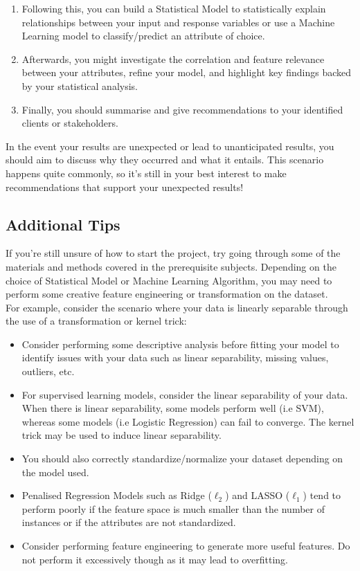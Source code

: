 \documentclass[12pt]{article}
\begin{document}
\begin{enumerate}
    \item Following this, you can build a Statistical Model to statistically explain relationships between your input and response variables or use a Machine Learning model to classify/predict an attribute of choice. 
    \item Afterwards, you might investigate the correlation and feature relevance between your attributes, refine your model, and highlight key findings backed by your statistical analysis.
    \item Finally, you should summarise and give recommendations to your identified clients or stakeholders. 
\end{enumerate}

In the event your results are unexpected or lead to unanticipated results, you should aim to discuss why they occurred and what it entails. This scenario happens quite commonly, so it's still in your best interest to make recommendations that support your unexpected results!

\subsection*{Additional Tips}
If you're still unsure of how to start the project, try going through some of the materials and methods covered in the prerequisite subjects. Depending on the choice of Statistical Model or Machine Learning Algorithm, you may need to perform some creative feature engineering or transformation on the dataset. \\

For example, consider the scenario where your data is linearly separable through the use of a transformation or kernel trick:
\begin{itemize}
    \item Consider performing some descriptive analysis before fitting your model to identify issues with your data such as linear separability, missing values, outliers, etc.
    \item For supervised learning models, consider the linear separability of your data. When there is linear separability, some models perform well (i.e SVM), whereas some models (i.e Logistic Regression) can fail to converge. The kernel trick may be used to induce linear separability.
    \item You should also correctly standardize/normalize your dataset depending on the model used.
    \item Penalised Regression Models such as Ridge ($\ell_2$) and LASSO ($\ell_1$) tend to perform poorly if the feature space is much smaller than the number of instances or if the attributes are not standardized.
    \item Consider performing feature engineering to generate more useful features. Do not perform it excessively though as it may lead to overfitting.
\end{itemize}
\end{document}
